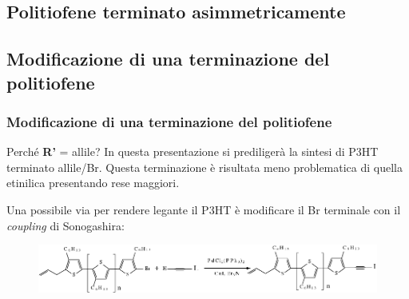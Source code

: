 \documentclass{beamer}
\begin{document}
  \subsection{Politiofene terminato asimmetricamente}


  \subsection{Modificazione di una terminazione del politiofene}
    \begin{frame}
      \frametitle{Modificazione di una terminazione del politiofene}

      \begin{block}{Perché \textbf{R'} = allile?}
	In questa presentazione si prediligerà la sintesi di P3HT terminato allile/Br. Questa terminazione è risultata meno problematica di quella etinilica presentando rese maggiori.
      \end{block}
\pause
	Una possibile via per rendere legante il P3HT è modificare il Br terminale con il \emph{coupling} di Sonogashira:
	\begin{figure} 
	\includegraphics[scale=0.40]{immagini/p3ht+legantegenerico.png}
	\end{figure}
    \end{frame}
\end{document}
